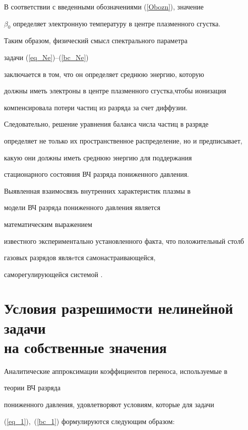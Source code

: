  


В соответствии с введенными обозначениями (\ref{Obozn}), значение


$\beta_0$ определяет электронную температуру в центре плазменного сгустка. 


Таким образом, физический смысл спектрального параметра 


задачи (\ref{eq_Ne})--(\ref{bc_Ne})


заключается в том, что он определяет среднюю энергию, которую


должны иметь электроны в центре плазменного сгустка,чтобы ионизация


компенсировала потери частиц из разряда за счет диффузии.


Следовательно, решение уравнения баланса числа частиц в разряде 


определяет не только их пространственное распределение, но и предписывает,


 какую они должны иметь среднюю энергию для поддержания


стационарного состояния ВЧ разряда пониженного давления. 


 Выявленная взаимосвязь внутренних характеристик плазмы в 


модели ВЧ разряда пониженного давления является 


математическим выражением 


известного экспериментально установленного факта, что положительный столб 


газовых разрядов являeтся самонастраивающейся, 


саморегулирующейся системой \cite{ZltElets}. 





\section{Условия разрешимости нелинейной задачи\protect\\


на собственные значения}





Аналитические аппроксимации коэффициентов переноса, используемые в


теории ВЧ разряда


пониженного давления, удовлетворяют условиям, которые для задачи 


(\ref{eq_1}),~(\ref{bc_1}) формулируются следующим образом:


